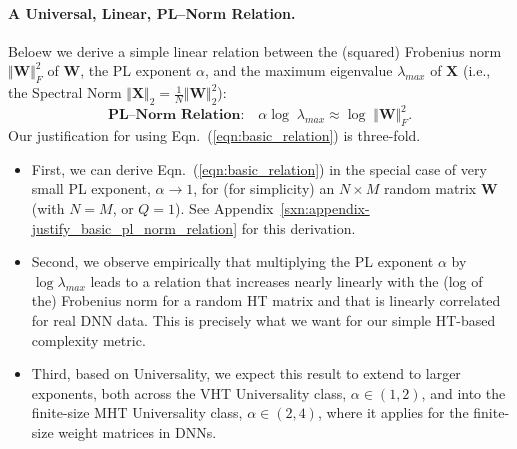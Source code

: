 
\paragraph{A Universal, Linear,  PL--Norm Relation.} 
Beloew we derive a simple linear relation between the (squared) Frobenius norm $\Vert\mathbf{W}\Vert^{2}_{F}$ of $\mathbf{W}$, the PL exponent $\alpha$, and the maximum eigenvalue $\lambda_{max}$ of $\mathbf{X}$ (i.e., the Spectral Norm $\Vert\mathbf{X}\Vert_{2}=\frac{1}{N}\Vert\mathbf{W}\Vert^{2}_{2}$):  
\begin{equation}
\textbf{PL--Norm Relation:} \quad \alpha\log\;\lambda_{max}\approx\log\;\Vert\mathbf{W}\Vert^{2}_{F}  .
\label{eqn:basic_relation}
\end{equation}
Our justification for using Eqn.~(\ref{eqn:basic_relation}) is three-fold.
\begin{itemize}
\item First, we can derive Eqn.~(\ref{eqn:basic_relation}) in the special case of very small PL exponent, $\alpha \rightarrow 1$, for (for simplicity) an $N\times M$ random matrix $\mathbf{W}$ (with $N=M$, or $Q=1$).
See Appendix~\ref{sxn:appendix-justify_basic_pl_norm_relation} for this derivation.
\item Second, we observe empirically that multiplying the PL exponent $\alpha$ by $\log\lambda_{max}$ leads to a relation that increases nearly linearly with the (log of the) Frobenius norm for a random HT matrix and that is linearly correlated for real DNN data. 
This is precisely what we want for our simple HT-based complexity metric.
\item Third, based on Universality, we expect this result to extend to larger exponents, both across the VHT Universality class, $\alpha\in(1,2)$, and into the finite-size MHT Universality class, $\alpha\in(2,4)$, where it applies for the finite-size weight matrices in DNNs.
\end{itemize}


